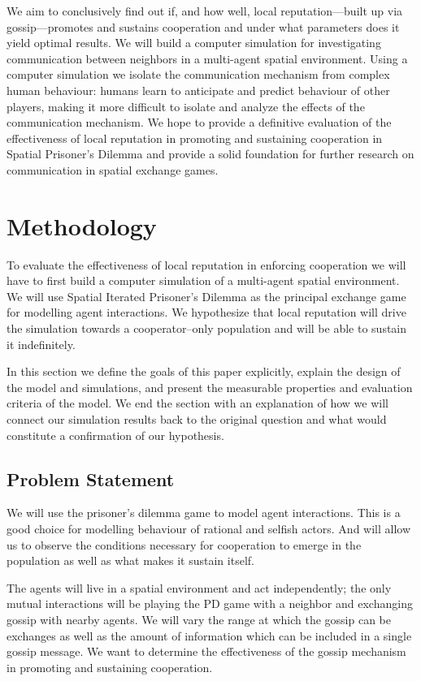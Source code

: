\documentclass[english]{article}
\begin{document}
We aim to conclusively find out if, and how well, local reputation---built up via gossip---promotes and sustains cooperation and under what parameters does it yield optimal results.
We will build a computer simulation for investigating communication between neighbors in a multi-agent spatial environment.
Using a computer simulation we isolate the communication mechanism from complex human behaviour: humans learn to anticipate and predict behaviour of other players, making it more difficult to isolate and analyze the effects of the communication mechanism.
We hope to provide a definitive evaluation of the effectiveness of local reputation in promoting and sustaining cooperation in Spatial Prisoner’s Dilemma and provide a solid foundation for further research on communication in spatial exchange games.



\section{Methodology}
To evaluate the effectiveness of local reputation in enforcing cooperation we will have to first build a computer simulation of a multi-agent spatial environment.
We will use Spatial Iterated Prisoner's Dilemma as the principal exchange game for modelling agent interactions.
We hypothesize that local reputation will drive the simulation towards a cooperator--only population and will be able to sustain it indefinitely.

In this section we define the goals of this paper explicitly,
explain the design of the model and simulations,
and present the measurable properties and evaluation criteria of the model.
We end the section with an explanation of how we will connect our simulation results back to the original question
and what would constitute a confirmation of our hypothesis.

\subsection{Problem Statement}
We will use the prisoner's dilemma game to model agent interactions.
This is a good choice for modelling behaviour of rational and selfish actors.
And will allow us to observe the conditions necessary for cooperation to emerge in the population as well as what makes it sustain itself.

The agents will live in a spatial environment and act independently;
the only mutual interactions will be playing the PD game with a neighbor and exchanging gossip with nearby agents.
We will vary the range at which the gossip can be exchanges as well as the amount of information which can be included in a single gossip message.
We want to determine the effectiveness of the gossip mechanism in promoting and sustaining cooperation.
\end{document}
